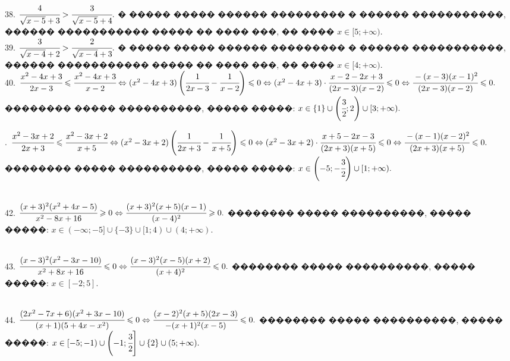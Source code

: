 \documentclass[12pt]{article}
\begin{document}
38. $\cfrac{4}{\sqrt{x-5}+3}>\cfrac{3}{\sqrt{x-5}+4}.$ � ����� ����� ������ ��������� � ������ �����������, ������ ����������� ����� �� ���� ���, �� ���� $x\in[5;+\infty).$\\
39. $\cfrac{3}{\sqrt{x-4}+2}>\cfrac{2}{\sqrt{x-4}+3}.$ � ����� ����� ������ ��������� � ������ �����������, ������ ����������� ����� �� ���� ���, �� ���� $x\in[4;+\infty).$\\
40. $\cfrac{x^2-4x+3}{2x-3}\leqslant\cfrac{x^2-4x+3}{x-2}\Leftrightarrow (x^2-4x+3)\left(\cfrac{1}{2x-3}-\cfrac{1}{x-2}\right)\leqslant0
\Leftrightarrow (x^2-4x+3)\cdot\cfrac{x-2-2x+3}{(2x-3)(x-2)}\leqslant0\Leftrightarrow\cfrac{-(x-3)(x-1)^2}{(2x-3)(x-2)}\leqslant0.$ �������� ����� ����������, ����� �����: $x\in\{1\}\cup\left(\cfrac{3}{2};2\right)\cup[3;+\infty).$
\begin{figure}[ht!]
\end{figure}\newpage{}. $\cfrac{x^2-3x+2}{2x+3}\leqslant\cfrac{x^2-3x+2}{x+5}\Leftrightarrow (x^2-3x+2)\left(\cfrac{1}{2x+3}-\cfrac{1}{x+5}\right)\leqslant0
\Leftrightarrow (x^2-3x+2)\cdot\cfrac{x+5-2x-3}{(2x+3)(x+5)}\leqslant0\Leftrightarrow\cfrac{-(x-1)(x-2)^2}{(2x+3)(x+5)}\leqslant0.$ �������� ����� ����������, ����� �����: $x\in\left(-5;-\cfrac{3}{2}\right)\cup[1;+\infty).$
\begin{figure}[ht!]
\end{figure}\\
42. $\cfrac{(x+3)^2(x^2+4x-5)}{x^2-8x+16}\geqslant0\Leftrightarrow\cfrac{(x+3)^2(x+5)(x-1)}{(x-4)^2}\geqslant0.$ �������� ����� ����������, ����� �����: $x\in(-\infty;-5]\cup\{-3\}\cup[1;4)\cup(4;+\infty).$
\begin{figure}[ht!]
\end{figure}\\
43. $\cfrac{(x-3)^2(x^2-3x-10)}{x^2+8x+16}\leqslant0\Leftrightarrow\cfrac{(x-3)^2(x-5)(x+2)}{(x+4)^2}\leqslant0.$ �������� ����� ����������, ����� �����: $x\in[-2;5].$
\begin{figure}[ht!]
\end{figure}\\
44. $\cfrac{(2x^2-7x+6)(x^2+3x-10)}{(x+1)(5+4x-x^2)}\leqslant0\Leftrightarrow\cfrac{(x-2)^2(x+5)(2x-3)}{-(x+1)^2(x-5)}\leqslant0.$ �������� ����� ����������, ����� �����: $x\in[-5;-1)\cup\left(-1;\cfrac{3}{2}\right]\cup\{2\}\cup(5;+\infty).$
\begin{figure}[ht!]
\end{figure}\newpage\noindent
\end{document}
